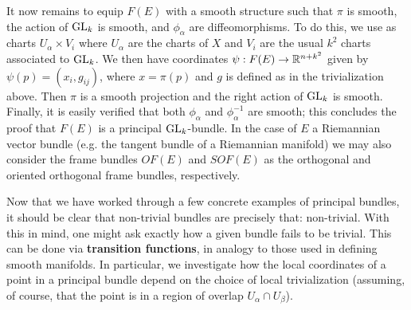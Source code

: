 \begin{exmp}
    It now remains to equip $F(E)$ with a smooth structure such that $\pi$ is smooth, the action of $\operatorname{GL}_k$ is smooth, and $\phi_\alpha$ are
    diffeomorphisms. To do this, we use as charts $U_\alpha\times V_i$ where $U_\alpha$ are the charts of $X$ and $V_i$ are the usual $k^2$
    charts associated to $\operatorname{GL}_k$. We then have coordinates $\psi:F(E)\to\mathbb{R}^{n+k^2}$ given by $\psi(p)=(x_i,g_{ij})$, where $x=\pi(p)$ and $g$
    is defined as in the trivialization above. Then $\pi$ is a smooth projection and the right action of $\operatorname{GL}_k$ is smooth. Finally, it is easily
    verified that both $\phi_\alpha$ and $\phi_\alpha^{-1}$ are smooth; this concludes the proof that $F(E)$ is a principal $\operatorname{GL}_k$-bundle. In the
    case of $E$ a Riemannian vector bundle (e.g. the tangent bundle of a Riemannian manifold) we may also consider the frame bundles
    $OF(E)$ and $SOF(E)$ as the orthogonal and oriented orthogonal frame bundles, respectively.
    

\end{exmp}

Now that we have worked through a few concrete examples of principal bundles, it should be clear that non-trivial bundles are precisely that: non-trivial.
With this in mind, one might ask exactly how a
given bundle fails to be trivial. This can be done via \textbf{transition functions}, in analogy to those used in defining smooth manifolds.
In particular, we investigate how the local coordinates of a point in a principal bundle depend on the choice of local trivialization (assuming, of
course, that the point is in a region of overlap $U_\alpha\cap U_\beta$).


